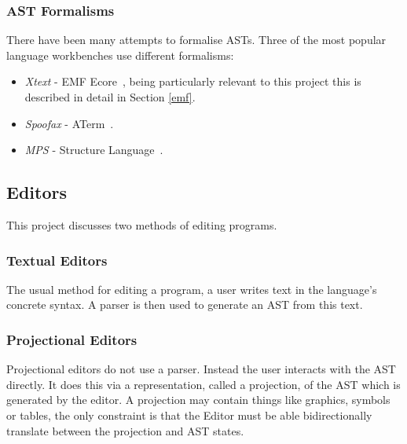 \documentclass{article}
\begin{document}
\subsubsection{AST Formalisms}\label{astFormalisms}
There have been many attempts to formalise ASTs. Three of the most popular language workbenches use different formalisms: \begin{itemize}
\item \emph{Xtext} - EMF Ecore~\cite{emf}, being particularly relevant to this project this is described in detail in Section \ref{emf}.
\item \emph{Spoofax} - ATerm~\cite{aterm}.
\item \emph{MPS} - Structure Language~\cite{mpsStructureLanguage}.
\end{itemize}
%
\subsection{Editors}
This project discusses two methods of editing programs.
\subsubsection{Textual Editors}
The usual method for editing a program, a user writes text in the language's concrete syntax. A parser is then used to generate an AST from this text.
\subsubsection{Projectional Editors}
Projectional editors do not use a parser. Instead the user interacts with the AST directly. It does this via a representation, called a projection, of the AST which is generated by the editor. A projection may contain things like graphics, symbols or tables, the only constraint is that the Editor must be able bidirectionally translate between the projection and AST states. 

\end{document}
